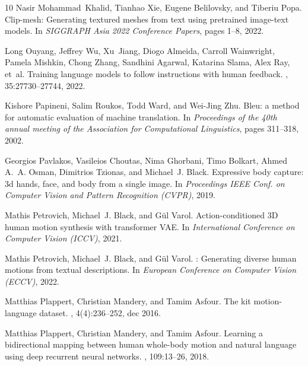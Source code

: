 \documentclass{article}
\begin{document}
{\begin{thebibliography}{10}
  Nasir Mohammad~Khalid, Tianhao Xie, Eugene Belilovsky, and Tiberiu Popa.
  \newblock Clip-mesh: Generating textured meshes from text using pretrained
    image-text models.
  \newblock In {\em SIGGRAPH Asia 2022 Conference Papers}, pages 1--8, 2022.
  
  Long Ouyang, Jeffrey Wu, Xu~Jiang, Diogo Almeida, Carroll Wainwright, Pamela
    Mishkin, Chong Zhang, Sandhini Agarwal, Katarina Slama, Alex Ray, et~al.
  \newblock Training language models to follow instructions with human feedback.
  ,
    35:27730--27744, 2022.
  
  Kishore Papineni, Salim Roukos, Todd Ward, and Wei-Jing Zhu.
  \newblock Bleu: a method for automatic evaluation of machine translation.
  \newblock In {\em Proceedings of the 40th annual meeting of the Association for
    Computational Linguistics}, pages 311--318, 2002.
  
  Georgios Pavlakos, Vasileios Choutas, Nima Ghorbani, Timo Bolkart, Ahmed A.~A.
    Osman, Dimitrios Tzionas, and Michael~J. Black.
  \newblock Expressive body capture: 3d hands, face, and body from a single
    image.
  \newblock In {\em Proceedings IEEE Conf. on Computer Vision and Pattern
    Recognition (CVPR)}, 2019.
  
  Mathis Petrovich, Michael~J. Black, and G{\"u}l Varol.
  \newblock Action-conditioned 3{D} human motion synthesis with transformer
    {VAE}.
  \newblock In {\em International Conference on Computer Vision (ICCV)}, 2021.
  
  Mathis Petrovich, Michael~J. Black, and G{\"u}l Varol.
  : Generating diverse human motions from textual descriptions.
  \newblock In {\em European Conference on Computer Vision ({ECCV})}, 2022.
  
  Matthias Plappert, Christian Mandery, and Tamim Asfour.
  \newblock The kit motion-language dataset.
  , 4(4):236--252, dec 2016.
  
  Matthias Plappert, Christian Mandery, and Tamim Asfour.
  \newblock Learning a bidirectional mapping between human whole-body motion and
    natural language using deep recurrent neural networks.
  , 109:13--26, 2018.
  

\end{thebibliography}}
\end{document}
